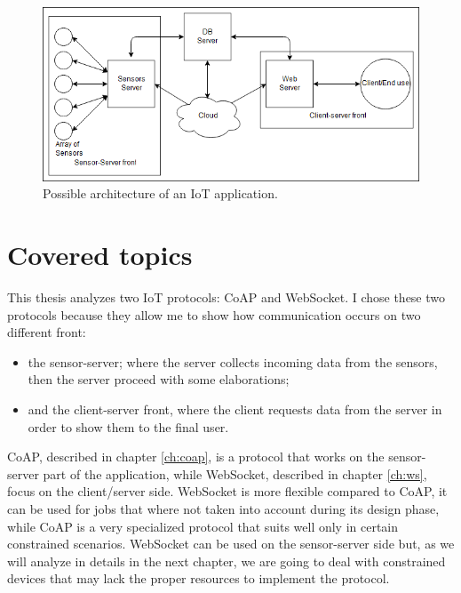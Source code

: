 	\begin{figure}
		\includegraphics[width=\linewidth]{intro-000.png}
		\caption{Possible architecture of an IoT application.}
		\label{fig:intro0}
	\end{figure}
	
	\section{Covered topics}
	
	This thesis analyzes two IoT protocols: CoAP and WebSocket.\newline
	I chose these two protocols because they allow me to show how communication occurs on two different front:
	\begin{itemize}
		\item the sensor-server; where the server collects incoming data from the sensors, then the server proceed with some elaborations;
		\item and the client-server front, where the client requests data from the server in order to show them to the final user.
	\end{itemize}

	CoAP, described in chapter \ref{ch:coap}, is a protocol that works on the sensor-server part of the application, while WebSocket, described in chapter \ref{ch:ws}, focus
	on the client/server side. WebSocket is more flexible compared to CoAP, it can be used for
	jobs that where not taken into account during its design phase, while CoAP is a very specialized
	protocol that suits well only in certain constrained scenarios.\newline
	WebSocket can be used on the sensor-server side but, as we will analyze in details in the next chapter,
	we are going to deal with constrained devices that may lack the proper resources to implement the protocol.\newline
	
